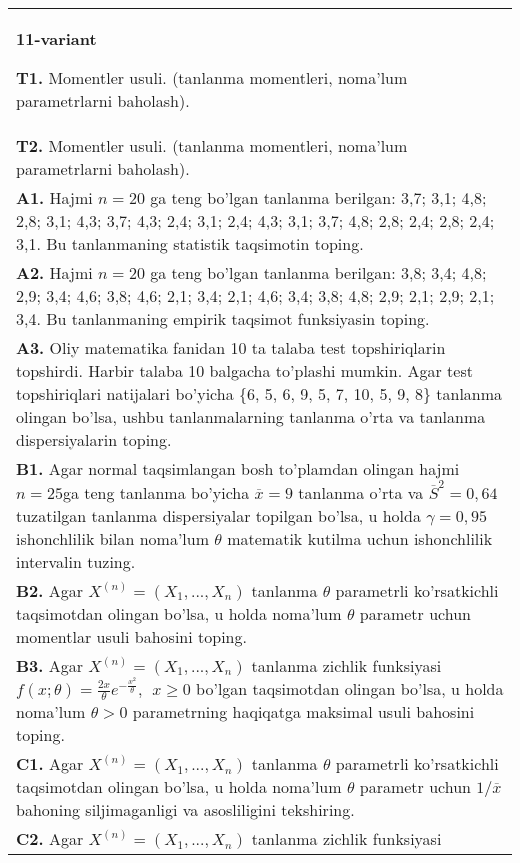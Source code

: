 \documentclass{article}
\begin{document}
\begin{tabular}{m{17cm}}
\textbf{11-variant}
\newline

\textbf{T1.} 
Momentler usuli. (tanlanma momentleri, noma'lum parametrlarni baholash).
\\
\textbf{T2.} 
Momentler usuli. (tanlanma momentleri, noma'lum parametrlarni baholash).
\\
\textbf{A1.} 
Hajmi \(n = 20\) ga teng bo'lgan tanlanma berilgan: 3,7; 3,1; 4,8; 2,8; 3,1; 4,3; 3,7; 4,3; 2,4; 3,1; 2,4; 4,3; 3,1; 3,7; 4,8; 2,8; 2,4; 2,8; 2,4; 3,1. Bu tanlanmaning statistik taqsimotin toping.
\\
\textbf{A2.} 
Hajmi \(n = 20\) ga teng bo'lgan tanlanma berilgan: 3,8; 3,4; 4,8; 2,9; 3,4; 4,6; 3,8; 4,6; 2,1; 3,4; 2,1; 4,6; 3,4; 3,8; 4,8; 2,9; 2,1; 2,9; 2,1; 3,4. Bu tanlanmaning empirik taqsimot funksiyasin toping.
\\
\textbf{A3.} 
Oliy matematika fanidan 10 ta talaba test topshiriqlarin topshirdi. Harbir talaba 10 balgacha to'plashi mumkin. Agar test topshiriqlari natijalari bo'yicha \{6, 5, 6, 9, 5, 7, 10, 5, 9, 8\} tanlanma olingan bo'lsa, ushbu tanlanmalarning tanlanma o'rta va tanlanma dispersiyalarin toping.
\\
\textbf{B1.} 
Agar normal taqsimlangan bosh to'plamdan olingan hajmi \(n = 25\)ga teng tanlanma bo'yicha \(\overline{x} = 9\) tanlanma o'rta va \({\overline{S}}^{2} = 0,64\) tuzatilgan tanlanma dispersiyalar topilgan bo'lsa, u holda \(\gamma = 0,95\) ishonchlilik bilan noma'lum \(\theta\) matematik kutilma uchun ishonchlilik intervalin tuzing.
\\
\textbf{B2.} 
Agar \(X^{(n)} = \left( X_{1},...,X_{n} \right)\) tanlanma \(\theta\) parametrli ko'rsatkichli taqsimotdan olingan bo'lsa, u holda noma'lum \(\theta\) parametr uchun momentlar usuli bahosini toping.
\\
\textbf{B3.} 
Agar \(X^{(n)} = \left( X_{1},...,X_{n} \right)\) tanlanma zichlik funksiyasi \(f(x;\theta) = \frac{2x}{\theta}e^{- \frac{x^{2}}{\theta}},\ \ x \geq 0\) bo'lgan taqsimotdan olingan bo'lsa, u holda noma'lum \(\theta > 0\) parametrning haqiqatga maksimal usuli bahosini toping.
\\
\textbf{C1.} 
Agar \(X^{(n)} = \left( X_{1},...,X_{n} \right)\) tanlanma \(\theta\) parametrli ko'rsatkichli taqsimotdan olingan bo'lsa, u holda noma'lum \(\theta\) parametr uchun \(1/\overline{x}\) bahoning siljimaganligi va asosliligini tekshiring.
\\
\textbf{C2.} 
Agar \(X^{(n)} = \left( X_{1},...,X_{n} \right)\) tanlanma zichlik funksiyasi\(f(x,\theta) = \left\{ \begin{matrix}

\end{matrix}
\end{tabular}
\end{document}
